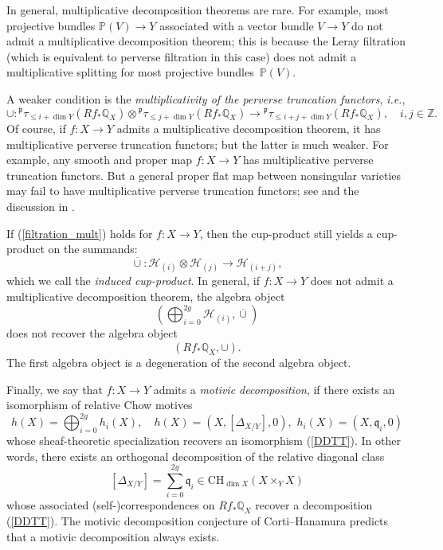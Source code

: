\documentclass[11pt]{amsart}
\theoremstyle{plain}
\theoremstyle{definition}
\theoremstyle{remark}
\newcommand{\BP}{{\mathbb{P}}}
\newcommand{\BQ}{{\mathbb{Q}}}
\newcommand{\BZ}{{\mathbb{Z}}}
\newcommand{\CH}{{\mathcal H}}
\newcommand{\Fp}{{\mathfrak{p}}}
\begin{document}
In general, multiplicative decomposition theorems are rare. For example, most projective bundles $\BP(V) \to Y$ associated with a vector bundle $V\to Y$ do not admit a multiplicative decomposition theorem; this is because the Leray filtration (which is equivalent to perverse filtration in this case) does not admit a multiplicative splitting for most projective bundles~$\BP(V)$.

A weaker condition is the \emph{multiplicativity of the perverse truncation functors}, \emph{i.e.}, 
\begin{equation}\label{filtration_mult}
\cup: {^\Fp}\tau_{\leq i + \dim Y}(Rf_*\BQ_{X})  \otimes {^\Fp}\tau_{\leq j + \dim Y}(Rf_*\BQ_{X}) \to {^\Fp}\tau_{\leq i + j + \dim Y}(Rf_*\BQ_{X}), \quad i,j \in \BZ.
\end{equation}
Of course, if $f: X\to Y$ admits a multiplicative decomposition theorem, it has multiplicative perverse truncation functors; but the latter is much weaker. For example, any smooth and proper map $f: X\to Y$ has multiplicative perverse truncation functors. But a general proper flat map between nonsingular varieties may fail to have multiplicative perverse truncation functors; see \cite[Exercise 5.6.8]{Park} and the discussion in \cite{dC_Survey}.

If (\ref{filtration_mult}) holds for $f: X\to Y$, then the cup-product still yields a cup-product on the summands:
\[
\overline{\cup}: \CH_{(i)} \otimes \CH_{(j)} \to \CH_{(i+j)},
\]
which we call the \emph{induced cup-product}. In general, if $f: X\to Y$ does not admit a multiplicative decomposition theorem, the algebra object
\[
(\bigoplus_{i=0}^{2g} \CH_{(i)}, \overline{\cup})
\]
does not recover the algebra object
\[
(Rf_* \BQ_X, \cup).
\]
The first algebra object is a degeneration of the second algebra object.


Finally, we say that $f: X \to Y$ admits a \emph{motivic decomposition}, if there exists an isomorphism of relative Chow motives
\[
h(X) = \bigoplus_{i=0}^{2g} h_i(X), \quad h(X) = (X, [\Delta_{X/Y}], 0), \,\, h_i(X) = (X, \mathfrak{q}_i, 0)
\]
whose sheaf-theoretic specialization recovers an isomorphism (\ref{DDTT}). In other words, there exists an orthogonal decomposition of the relative diagonal class
\[
[\Delta_{X/Y}] = \sum_{i=0}^{2g} \mathfrak{q}_i \in \mathrm{CH}_{\dim X} (X\times_Y X)
\]
whose associated (self-)correspondences on $Rf_* \BQ_X$ recover a decomposition (\ref{DDTT}). The motivic decomposition conjecture of Corti--Hanamura \cite{CH} predicts that a motivic decomposition always exists.
\end{document}
